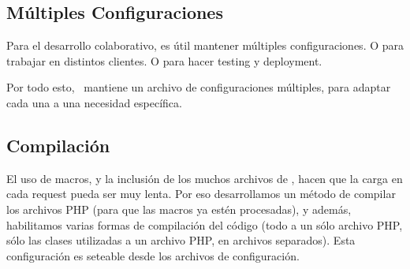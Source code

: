 \subsection{Múltiples Configuraciones}

Para el desarrollo colaborativo, es útil mantener múltiples configuraciones. O para trabajar en distintos clientes. O para hacer testing y deployment.

Por todo esto, \PWB \ mantiene un archivo de configuraciones múltiples, para adaptar cada una a una necesidad específica.

\subsection{Compilación}

El uso de macros, y la inclusión de los muchos archivos de \PWB, hacen que la carga en cada request pueda ser muy lenta. Por eso desarrollamos un método de compilar los archivos PHP (para que las macros ya estén procesadas), y además, habilitamos varias formas de compilación del código (todo a un sólo archivo PHP, sólo las clases utilizadas a un archivo PHP, en archivos separados). Esta configuración es seteable desde los archivos de configuración.